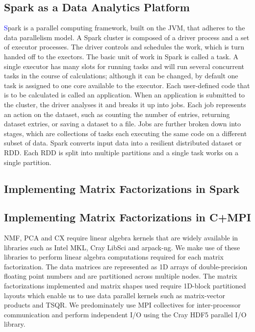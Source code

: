 
\subsection{Spark as a Data Analytics Platform} \textcolor{blue}

Spark is a parallel computing framework, built on the JVM, that adheres to the data parallelism model. A Spark cluster is composed of a driver process and a set of executor processes. The driver controls and schedules the work, which is turn handed off to the exectors. The basic unit of work in Spark is called a task. A single executor has many slots for running tasks and will run several concurrent tasks in the course of calculations; although it can be changed, by default one task is assigned to one core available to the executor. Each user-defined code that is to be calculated is called an application. When an application is submitted to the cluster, the driver analyses it and breaks it up into jobs. Each job represents an action on the dataset, such as counting the number of entries, returning dataset extries, or saving a dataset to a file. Jobs are further broken down into stages, which are collections of tasks each executing the same code on a different subset of data. Spark converts input data into a resilient distributed dataset or RDD. Each RDD is split into multiple partitions and a single task works on a single partition.

\subsection{Implementing Matrix Factorizations in Spark}

\subsection{Implementing Matrix Factorizations in C+MPI}
NMF, PCA and CX require linear algebra kernels that are widely available in libraries such as Intel MKL, Cray LibSci and arpack-ng. We make use of these libraries to perform linear algebra computations required for each matrix factorization. The data matrices are represented as 1D arrays of double-precision floating point numbers and are partitioned across multiple nodes. The matrix factorizations implemented and matrix shapes used require 1D-block partitioned layouts which enable us to use data parallel kernels such as matrix-vector products and TSQR. We predominately use MPI collectives for inter-processor communication and perform independent I/O using the Cray HDF5 parallel I/O library.  